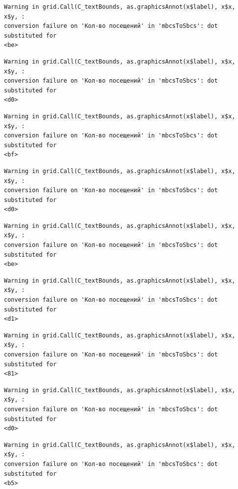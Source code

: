 \documentclass[
  letterpaper,
  DIV=11,
  numbers=noendperiod]{scrartcl}
\begin{document}
\begin{verbatim}
Warning in grid.Call(C_textBounds, as.graphicsAnnot(x$label), x$x, x$y, :
conversion failure on 'Кол-во посещений' in 'mbcsToSbcs': dot substituted for
<be>
\end{verbatim}

\begin{verbatim}
Warning in grid.Call(C_textBounds, as.graphicsAnnot(x$label), x$x, x$y, :
conversion failure on 'Кол-во посещений' in 'mbcsToSbcs': dot substituted for
<d0>
\end{verbatim}

\begin{verbatim}
Warning in grid.Call(C_textBounds, as.graphicsAnnot(x$label), x$x, x$y, :
conversion failure on 'Кол-во посещений' in 'mbcsToSbcs': dot substituted for
<bf>
\end{verbatim}

\begin{verbatim}
Warning in grid.Call(C_textBounds, as.graphicsAnnot(x$label), x$x, x$y, :
conversion failure on 'Кол-во посещений' in 'mbcsToSbcs': dot substituted for
<d0>
\end{verbatim}

\begin{verbatim}
Warning in grid.Call(C_textBounds, as.graphicsAnnot(x$label), x$x, x$y, :
conversion failure on 'Кол-во посещений' in 'mbcsToSbcs': dot substituted for
<be>
\end{verbatim}

\begin{verbatim}
Warning in grid.Call(C_textBounds, as.graphicsAnnot(x$label), x$x, x$y, :
conversion failure on 'Кол-во посещений' in 'mbcsToSbcs': dot substituted for
<d1>
\end{verbatim}

\begin{verbatim}
Warning in grid.Call(C_textBounds, as.graphicsAnnot(x$label), x$x, x$y, :
conversion failure on 'Кол-во посещений' in 'mbcsToSbcs': dot substituted for
<81>
\end{verbatim}

\begin{verbatim}
Warning in grid.Call(C_textBounds, as.graphicsAnnot(x$label), x$x, x$y, :
conversion failure on 'Кол-во посещений' in 'mbcsToSbcs': dot substituted for
<d0>
\end{verbatim}

\begin{verbatim}
Warning in grid.Call(C_textBounds, as.graphicsAnnot(x$label), x$x, x$y, :
conversion failure on 'Кол-во посещений' in 'mbcsToSbcs': dot substituted for
<b5>
\end{verbatim}
\end{document}
